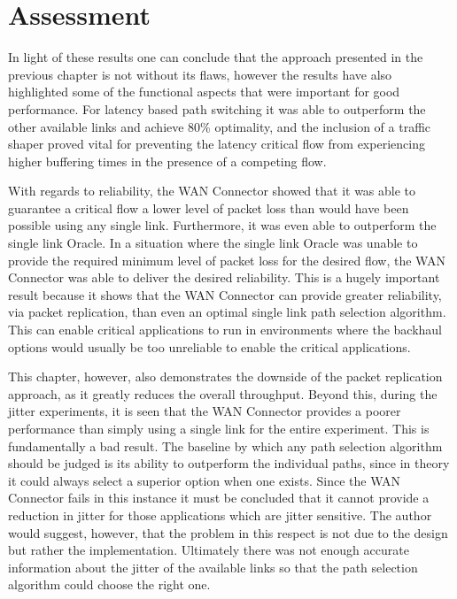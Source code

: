\section{Assessment}

In light of these results one can conclude that the approach presented in the previous chapter is not without its flaws, however the results have also highlighted some of the functional aspects that were important for good performance. For latency based path switching it was able to outperform the other available links and achieve 80\% optimality, and the inclusion of a traffic shaper proved vital for preventing the latency critical flow from experiencing higher buffering times in the presence of a competing flow.

With regards to reliability, the WAN Connector showed that it was able to guarantee a critical flow a lower level of packet loss than would have been possible using any single link. Furthermore, it was even able to outperform the single link Oracle. In a situation where the single link Oracle was unable to provide the required minimum level of packet loss for the desired flow, the WAN Connector was able to deliver the desired reliability. This is a hugely important result because it shows that the WAN Connector can provide greater reliability, via packet replication, than even an optimal single link path selection algorithm. This can enable critical applications to run in environments where the backhaul options would usually be too unreliable to enable the critical applications.

This chapter, however, also demonstrates the downside of the packet replication approach, as it greatly reduces the overall throughput. Beyond this, during the jitter experiments, it is seen that the WAN Connector provides a poorer performance than simply using a single link for the entire experiment. This is fundamentally a bad result. The baseline by which any path selection algorithm should be judged is its ability to outperform the individual paths, since in theory it could always select a superior option when one exists. Since the WAN Connector fails in this instance it must be concluded that it cannot provide a reduction in jitter for those applications which are jitter sensitive. The author would suggest, however, that the problem in this respect is not due to the design but rather the implementation. Ultimately there was not enough accurate information about the jitter of the available links so that the path selection algorithm could choose the right one.












